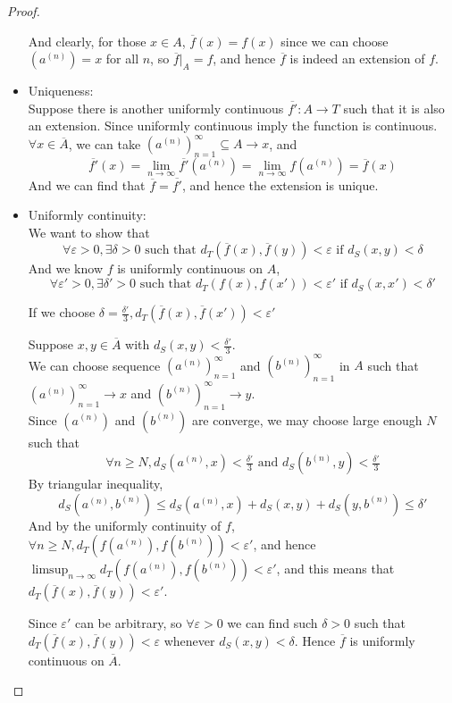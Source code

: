 \begin{proof}
\begin{itemize}
        And clearly, for those $x \in A$, $\overline{f}(x) = f(x)$ since we can choose $(a^{(n)}) = x$ for all $n$, so $\overline{f}|_A = f$, and hence $\overline{f}$ is indeed an extension of $f$.

        \item Uniqueness: \\
        Suppose there is another uniformly continuous $\overline{f'} : A \to T$ such that it is also an extension. Since uniformly continuous imply the function is continuous. $\forall x \in \overline{A}$, we can take $(a^{(n)})_{n=1}^\infty \subseteq A \to x$, and 
        \[
        \overline{f'}(x) = \lim_{n \to \infty} \overline{f'}(a^{(n)}) = \lim_{n \to \infty} f(a^{(n)}) = \overline{f}(x)
        \]
        And we can find that $\overline{f} = \overline{f'}$, and hence the extension is unique.

        \item Uniformly continuity: \\
        We want to show that
        \[
        \forall \varepsilon > 0, \exists \delta > 0 \text{ such that } d_T(\overline{f}(x), \overline{f}(y)) < \varepsilon \text{ if } d_S(x, y) < \delta 
        \]
        And we know $f$ is uniformly continuous on $A$,
        \[
        \forall \varepsilon' > 0, \exists \delta' > 0 \text{ such that } d_T({f}(x), {f}(x')) < \varepsilon' \text{ if } d_S(x, x') < \delta' 
        \]
        \begin{claim}
            If we choose $\delta = \tfrac{\delta'}{3}, d_T(\overline{f}(x), \overline{f}(x')) < \varepsilon'$
        \end{claim}
        \begin{explanation}
            Suppose $x, y \in \overline{A}$ with $d_S(x,y) < \tfrac{\delta'}{3}$. \\
            We can choose sequence $(a^{(n)})_{n=1}^\infty$ and $(b^{(n)})_{n=1}^\infty$ in $A$ such that $(a^{(n)})_{n=1}^\infty \to x$ and $(b^{(n)})_{n=1}^\infty \to y$. \\
            Since $(a^{(n)})$ and $(b^{(n)})$ are converge, we may choose large enough $N$ such that
            \[
                \forall n \ge N, d_S(a^{(n)}, x) < \tfrac{\delta'}{3} \text{ and } d_S(b^{(n)}, y) < \tfrac{\delta'}{3}
            \]
            By triangular inequality,
            \[
                d_S(a^{(n)}, b^{(n)}) \le d_S(a^{(n)},x) + d_S(x,y) + d_S(y,b^{(n)}) \le \delta'
            \]
            And by the uniformly continuity of $f$, $\forall n \ge N, d_T(f(a^{(n)}), f(b^{(n)})) < \varepsilon'$, and hence $\limsup_{n \to \infty} d_T(f(a^{(n)}), f(b^{(n)})) < \varepsilon'$, and this means that $d_T(\overline{f}(x), \overline{f}(y)) < \varepsilon'$.
        \end{explanation}

        Since $\varepsilon'$ can be arbitrary, so $\forall \varepsilon > 0$ we can find such $\delta > 0$ such that $d_T(\overline{f}(x), \overline{f}(y)) < \varepsilon$ whenever $d_S(x,y) < \delta$. Hence $\overline{f}$ is uniformly continuous on $\overline{A}$.
        
    \end{itemize}
\end{proof}